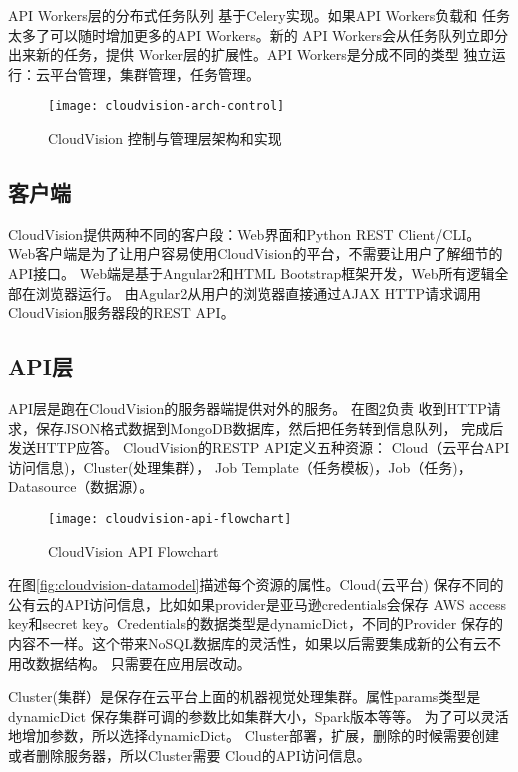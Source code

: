API Workers层的分布式任务队列
基于Celery实现。\cite{celery}如果API Workers负载和
任务太多了可以随时增加更多的API Workers。新的
API Workers会从任务队列立即分出来新的任务，提供
Worker层的扩展性。API Workers是分成不同的类型
独立运行：云平台管理，集群管理，任务管理。

\begin{figure}[h]
  \centering
    \texttt{[image: cloudvision-arch-control]}
  \caption{CloudVision 控制与管理层架构和实现}
  \label{fig:cloudvision-arch-control}
\end{figure}

\subsection{客户端}
CloudVision提供两种不同的客户段：Web界面和Python REST Client/CLI。
Web客户端是为了让用户容易使用CloudVision的平台，不需要让用户了解细节的API接口。
Web端是基于Angular2和HTML Bootstrap框架开发，Web所有逻辑全部在浏览器运行。
由Agular2从用户的浏览器直接通过AJAX HTTP请求调用CloudVision服务器段的REST API。

\subsection{API层}
API层是跑在CloudVision的服务器端提供对外的服务。
在图\ref{fig:cloudvision-api-flowchart}负责
收到HTTP请求，保存JSON格式数据到MongoDB数据库，然后把任务转到信息队列，
完成后发送HTTP应答。 CloudVision的RESTP API定义五种资源：
Cloud（云平台API访问信息)，Cluster(处理集群），
Job Template（任务模板)，Job（任务)，Datasource（数据源）。
\begin{figure}[h]
  \centering
    \texttt{[image: cloudvision-api-flowchart]}
  \caption{CloudVision API Flowchart}
  \label{fig:cloudvision-api-flowchart}
\end{figure}


在图\ref{fig:cloudvision-datamodel}描述每个资源的属性。Cloud(云平台)
保存不同的公有云的API访问信息，比如如果provider是亚马逊credentials会保存
AWS access key和secret key。Credentials的数据类型是dynamicDict，不同的Provider
保存的内容不一样。这个带来NoSQL数据库的灵活性，如果以后需要集成新的公有云不用改数据结构。
只需要在应用层改动。

Cluster(集群）是保存在云平台上面的机器视觉处理集群。属性params类型是dynamicDict
保存集群可调的参数比如集群大小，Spark版本等等。
为了可以灵活地增加参数，所以选择dynamicDict。
Cluster部署，扩展，删除的时候需要创建或者删除服务器，所以Cluster需要
Cloud的API访问信息。

